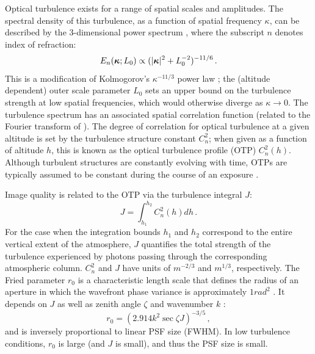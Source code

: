 \documentclass[twocolumn,twocolappendix]{openjournal}
\begin{document}
Optical turbulence exists for a range of spatial scales and amplitudes.
The spectral density of this turbulence, as a function of spatial frequency $\kappa$, can be described by the 3-dimensional \vk power spectrum \citep{von_karman_progress_1948, tokovinin_wavefront_1998}, where the subscript $n$ denotes index of refraction:
\begin{equation}\label{eqn:vk}
    E_n(\vect{\kappa};L_0) \propto ( \lvert \vect{\kappa} \rvert^2 + L_0^{-2})^{-11/6} \,.
\end{equation}
This is a modification of Kolmogorov's $\kappa^{-11/3}$ power law \citep{kolmogorov_local_1941}; the (altitude dependent) outer scale parameter $L_0$ sets an upper bound on the turbulence strength at low spatial frequencies, which would otherwise diverge as $\kappa \rightarrow 0$.
The \vk turbulence spectrum has an associated spatial correlation function (related to the Fourier transform of ). 
The degree of correlation for optical turbulence at a given altitude is set by the turbulence structure constant $C_n^2$; 
when given as a function of altitude $h$, this is known as the optical turbulence profile (OTP) $C_n^2(h)$. 
Although turbulent structures are constantly evolving with time, OTPs are typically assumed to be constant during the course of an exposure \citep{roddier_v_1981}.

Image quality is related to the OTP via the turbulence integral $J$:
\begin{equation} \label{eqn:j}
	J = \int_{h_1}^{h_2} C_n^2(h) dh \,.
\end{equation}
For the case when the integration bounds $h_1$ and $h_2$ correspond to the entire vertical extent of the atmosphere, $J$ quantifies the total strength of the turbulence experienced by photons passing through the corresponding atmospheric column.
$C_n^2$ and $J$ have units of $\unit{m^{-2/3}}$ and $\unit{m^{1/3}}$, respectively. 
The Fried parameter $r_0$ is a characteristic length scale that defines the radius of an aperture in which the wavefront phase variance is approximately $ 1\unit{rad^2}$ \citep{fried_statistics_1965}. 
It depends on $J$ as well as zenith angle $\zeta$ and wavenumber $k$ \citep{roddier_v_1981}:
\begin{equation} \label{eqn:r0}
	r_0 = (2.914 k^2 \sec \zeta J )^{-3/5}\,,
\end{equation}
and is inversely proportional to linear PSF size (FWHM).
In low turbulence conditions, $r_0$ is large (and $J$ is small), and thus the PSF size is small. 
\end{document}
